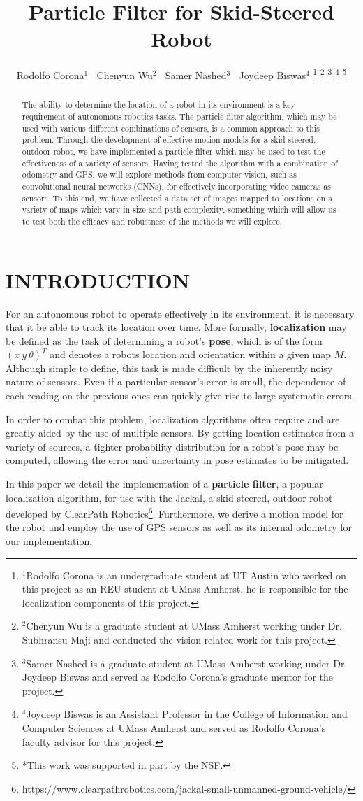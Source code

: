 \documentclass[letterpaper, 12 pt, conference]{ieeeconf}  %
\title{\LARGE \bf
Particle Filter for Skid-Steered Robot
}
\author{Rodolfo Corona$^{1}$ 
$~$ Chenyun Wu$^{2}$ $~$ Samer Nashed$^{3}$ $~$ Joydeep Biswas$^{4}$ %
\thanks{$^{1}$Rodolfo Corona is an undergraduate student at UT Austin who worked on this project as an REU student at UMass Amherst, he is responsible for the localization components of this project.}
\thanks{$^{2}$Chenyun Wu is a graduate student at UMass Amherst working under Dr. Subhransu Maji and conducted the vision related work for this project.}
\thanks{$^{3}$Samer Nashed is a graduate student at UMass Amherst working under Dr. Joydeep Biswas and served as Rodolfo Corona's graduate mentor for the project.}
\thanks{$^{4}$Joydeep Biswas is an Assistant Professor in the College of Information and Computer Sciences at UMass Amherst and served as Rodolfo Corona's faculty advisor for this project.} 
\thanks{*This work was supported in part by the NSF.}
}
\begin{document}
\maketitle
\thispagestyle{empty}
\pagestyle{empty}


\begin{abstract}

The ability to determine the location of a robot in its environment is a key requirement of autonomous robotics tasks. The particle filter algorithm, which may be used with various different combinations of sensors, is a common approach to this problem. Through the development of effective motion models for a skid-steered, outdoor robot, we have implemented a particle filter which may be used to test the effectiveness of a variety of sensors. Having tested the algorithm with a combination of odometry and GPS, we will explore methods from computer vision, such as convolutional neural networks (CNNs), for effectively incorporating video cameras as sensors. To this end, we have collected a data set of images mapped to locations on a variety of maps which vary in size and path complexity, something which will allow us to test both the efficacy and robustness of the methods we will explore.

\end{abstract}


\section{INTRODUCTION}
For an autonomous robot to operate effectively in its environment, it is necessary that it be able to track its location over time. More formally, \textbf{localization} may be defined as the task of determining a robot's \textbf{pose}, which is of the form $(x~y~\theta)^T$ and denotes a robots location and orientation within a given map $M$. Although simple to define, this task is made difficult by the inherently noisy nature of sensors. Even if a particular sensor's error is small, the dependence of each reading on the previous ones can quickly give rise to large systematic errors.  
\par
In order to combat this problem, localization algorithms often require and are greatly aided by the use of multiple sensors. By getting location estimates from a variety of sources, a tighter probability distribution for a robot's pose may be computed, allowing the error and uncertainty in pose estimates to be mitigated. 
\par
In this paper we detail the implementation of a \textbf{particle filter}, a popular localization algorithm, for use with the Jackal, a skid-steered, outdoor robot developed by ClearPath Robotics\footnote{https://www.clearpathrobotics.com/jackal-small-unmanned-ground-vehicle/}. Furthermore, we derive a motion model for the robot and employ the use of GPS sensors as well as its internal odometry for our implementation.
\end{document}
